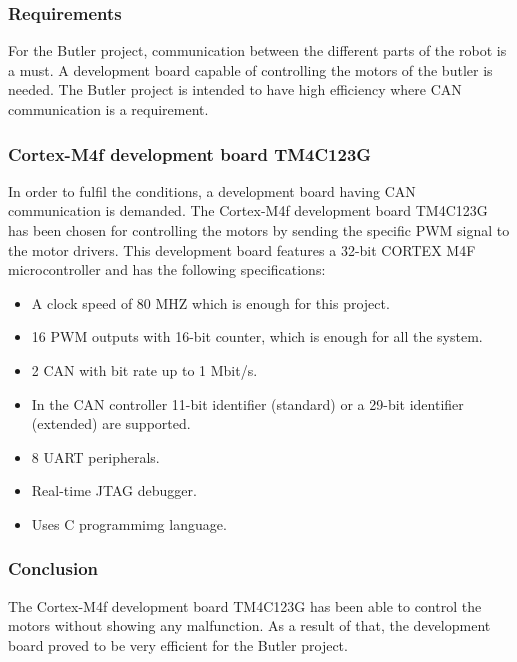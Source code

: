 \subsubsection{Requirements}
For the Butler project, communication between the different parts of the robot is a must. A development board capable of controlling the motors of the butler is needed. The Butler project is intended to have high efficiency where CAN communication is a requirement.

\subsubsection{Cortex-M4f development board TM4C123G}
In order to fulfil the conditions, a development board having CAN communication is demanded. The Cortex-M4f development board TM4C123G\cite{cor} has been chosen for controlling the motors by sending the specific PWM signal to the motor drivers. This development board features a 32-bit CORTEX M4F microcontroller and has the following specifications:
\begin{itemize}
    \item A clock speed of 80 MHZ which is enough for this project.
    \item 16 PWM outputs with 16-bit counter, which is enough for all the system.
    \item 2 CAN with bit rate up to 1 Mbit/s.
    \item In the CAN controller 11-bit identifier (standard) or a 29-bit identifier (extended) are supported.
    \item 8 UART peripherals.
    \item Real-time JTAG debugger.
    \item Uses C programmimg language.
\end{itemize}

\subsubsection{Conclusion}
The Cortex-M4f development board TM4C123G has been able to control the motors without showing any malfunction. As a result of that, the development board proved to be very efficient for the Butler project.


